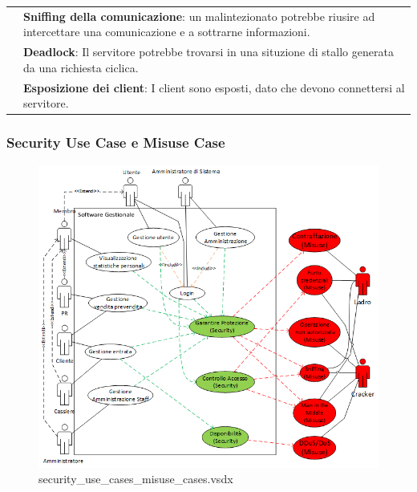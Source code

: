 \documentclass[a4paper]{article}
\begin{document}
\begin{center}
\begin{tabularx}{1\textwidth}{|l|X|}
                                   & \textbf{Sniffing della comunicazione}: un malintezionato potrebbe riusire ad intercettare una comunicazione e a sottrarne informazioni. \\
                                   & \textbf{Deadlock}: Il servitore potrebbe trovarsi in una situzione di stallo generata da una richiesta ciclica. \\
                                   & \textbf{Esposizione dei client}: I client sono esposti, dato che devono connettersi al servitore.\\
        \hline
    \end{tabularx}
\end{center}

\subsubsection{Security Use Case e Misuse Case}


\begin{figure}[H]
    \includegraphics[scale=0.9]{Analisi/Cases/security_use_cases_misuse_cases.png}
    \centering
    \caption{security\_use\_cases\_misuse\_cases.vsdx}
\end{figure}
\end{document}
